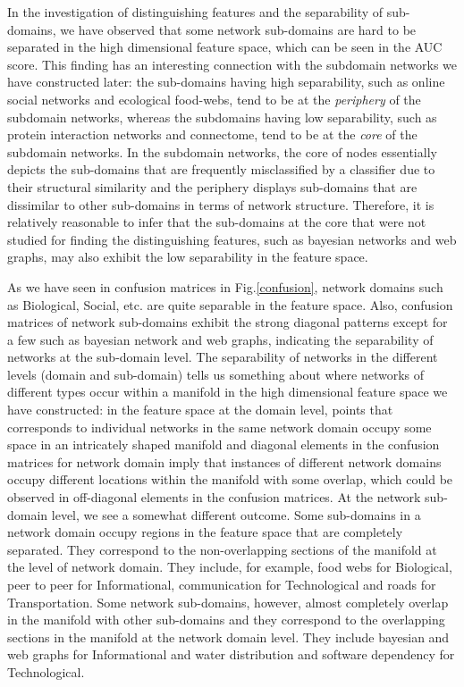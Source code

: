 \documentclass{article}
\begin{document}
In the investigation of distinguishing features and the separability of sub-domains, we have observed that some network sub-domains are hard to be separated in the high dimensional feature space, which can be seen in the AUC score. This finding has an interesting connection with the subdomain networks we have constructed later: the sub-domains having high separability, such as online social networks and ecological food-webs, tend to be at the \textit{periphery} of the subdomain networks, whereas the subdomains having low separability, such as protein interaction networks and connectome, tend to be at the \textit{core} of the subdomain networks. In the subdomain networks, the core of nodes essentially depicts the sub-domains that are frequently misclassified by a classifier due to their structural similarity and the periphery displays sub-domains that are dissimilar to other sub-domains in terms of network structure. Therefore, it is relatively reasonable to infer that the sub-domains at the core that were not studied for finding the distinguishing features, such as bayesian networks and web graphs, may also exhibit the low separability in the feature space. 


 As we have seen in confusion matrices in Fig.\ref{confusion}, network domains such as Biological, Social, etc. are quite separable in the feature space. Also, confusion matrices of network sub-domains exhibit the strong diagonal patterns except for a few such as bayesian network and web graphs, indicating the separability of networks at the sub-domain level. The separability of networks in the different levels (domain and sub-domain) tells us something about where networks of different types occur within a manifold in the high dimensional feature space we have constructed: in the feature space at the domain level, points that corresponds to individual networks in the same network domain occupy some space in an intricately shaped manifold and diagonal elements in the confusion matrices for network domain imply that instances of different network domains occupy different locations within the manifold with some overlap, which could be observed in off-diagonal elements in the confusion matrices. At the network sub-domain level, we see a somewhat different outcome. Some sub-domains in a network domain occupy regions in the feature space that are completely separated. They correspond to the non-overlapping sections of the manifold at the level of network domain. They include, for example, food webs for Biological, peer to peer for Informational, communication for Technological and roads for Transportation. Some network sub-domains, however, almost completely overlap in the manifold with other sub-domains and they correspond to the overlapping sections in the manifold at the network domain level. They include bayesian and web graphs for Informational and water distribution and software dependency for Technological. 
\end{document}
